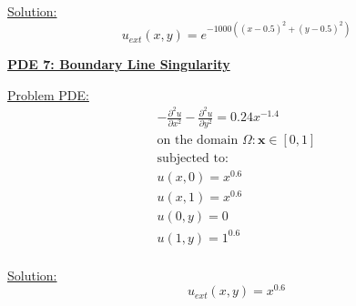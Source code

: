 \documentclass[.\jobname.tex]{subfiles}
\begin{document}
\underline{Solution:}
\begin{equation}
\label{eq:sol6}
u_{ext}(x,y) = e^{-1000((x-0.5)^{2} + (y-0.5)^{2})}
\end{equation}




\begin{figure}[H]
	\centering
	\noindent{}
	\label{fig:sol_plot_6}
\end{figure}




\newpage





\underline{\textbf{PDE 7: Boundary Line Singularity}} 

\underline{Problem PDE:} 
\begin{equation}
\label{eq:pde7}
\begin{split}
-\frac{\partial^2 u}{\partial x^2} - \frac{\partial^2 u}{\partial y^2} = 0.24 x^{-1.4}\\
\text{on the domain } \Omega: \mathbf{x} \in [0,1] \\
\text{subjected to: } \\
u(x,0) = x^{0.6} \\
u(x,1) = x^{0.6} \\
u(0,y) = 0 \\
u(1,y) = 1^{0.6} \\
\end{split}
\end{equation}


\underline{Solution:} 
\begin{equation}
\label{eq:sol7}
u_{ext}(x,y) = x^{0.6}
\end{equation}
\end{document}
